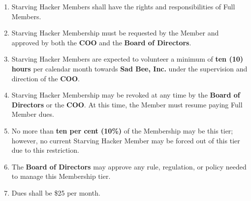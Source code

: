\documentclass[11pt, oneside]{article} %
\begin{document}
\begin{enumerate}
	\begin{enumerate}
		\item Starving Hacker Members shall have the rights and responsibilities of Full Members.
		\item Starving Hacker Membership must be requested by the Member and approved by both the \textbf{COO} and the \textbf{Board of Directors}.
		\item Starving Hacker Members are expected to volunteer a minimum of \textbf{ten (10) hours} per calendar month towards \textbf{Sad Bee, Inc.} under the supervision and direction of the \textbf{COO}.
		\item Starving Hacker Membership may be revoked at any time by the \textbf{Board of Directors} or the \textbf{COO}.  At this time, the Member must resume paying Full Member dues.
		\item No more than \textbf{ten per cent (10\%)} of the Membership may be this tier; however, no current Starving Hacker Member may be forced out of this tier due to this restriction.
		\item The \textbf{Board of Directors} may approve any rule, regulation, or policy needed to manage this Membership tier.
		\item Dues shall be \$25 per month.
	\end{enumerate}
\end{enumerate}
\end{document}
